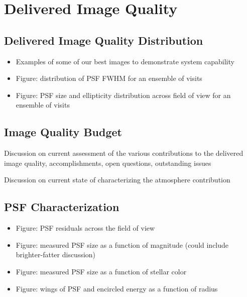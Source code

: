 \section{Delivered Image Quality}
\label{sec:image_quality}

\subsection{Delivered Image Quality Distribution}

\begin{itemize}
    \item Examples of some of our best images to demonstrate system capability
    \item Figure: distribution of PSF FWHM for an ensemble of visits
    \item Figure: PSF size and ellipticity distribution across field of view for an ensemble of visits
\end{itemize}

\subsection{Image Quality Budget}

Discussion on current assessment of the various contributions to the delivered image quality, accomplishments, open questions, outstanding issues

Discussion on current state of characterizing the atmosphere contribution

\subsection{PSF Characterization}

\begin{itemize}
    \item Figure: PSF residuals across the field of view
    \item Figure: measured PSF size as a function of magnitude (could include brighter-fatter discussion)
    \item Figure: measured PSF size as a function of stellar color
    \item Figure: wings of PSF and encircled energy as a function of radius
\end{itemize}